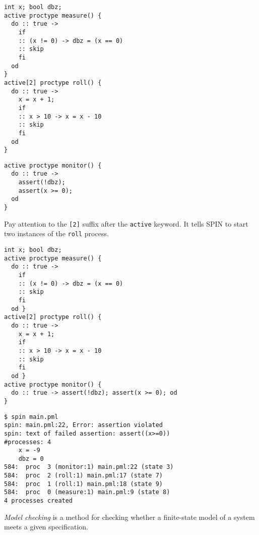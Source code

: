 \documentclass{article}
\begin{document}
\begin{pptWide}{2}
{\scriptsize\begin{verbatim}
int x; bool dbz;
active proctype measure() {
  do :: true ->
    if
    :: (x != 0) -> dbz = (x == 0)
    :: skip
    fi
  od
}
active[2] proctype roll() {
  do :: true ->
    x = x + 1;
    if
    :: x > 10 -> x = x - 10
    :: skip
    fi
  od
}
\end{verbatim}
}
\par\columnbreak\par
{\scriptsize\begin{verbatim}
active proctype monitor() {
  do :: true ->
    assert(!dbz);
    assert(x >= 0);
  od
}
\end{verbatim}
}

Pay attention to the \texttt{[2]} suffix after the \texttt{active}
keyword. It tells SPIN to start two instances of the \texttt{roll} process.
\end{pptWide}

\plush{}


\begin{pptWide}{2}
{\scriptsize\begin{verbatim}
int x; bool dbz;
active proctype measure() {
  do :: true ->
    if
    :: (x != 0) -> dbz = (x == 0)
    :: skip
    fi
  od }
active[2] proctype roll() {
  do :: true ->
    x = x + 1;
    if
    :: x > 10 -> x = x - 10
    :: skip
    fi
  od }
active proctype monitor() {
  do :: true -> assert(!dbz); assert(x >= 0); od
}
\end{verbatim}
}
\par\columnbreak\par
{\scriptsize\begin{verbatim}
$ spin main.pml
spin: main.pml:22, Error: assertion violated
spin: text of failed assertion: assert((x>=0))
#processes: 4
    x = -9
    dbz = 0
584:  proc  3 (monitor:1) main.pml:22 (state 3)
584:  proc  2 (roll:1) main.pml:17 (state 7)
584:  proc  1 (roll:1) main.pml:18 (state 9)
584:  proc  0 (measure:1) main.pml:9 (state 8)
4 processes created
\end{verbatim}
}
\end{pptWide}

\plush{}



\emph{Model checking} is a method for checking whether a finite-state model of a system meets a given specification.
\end{document}
